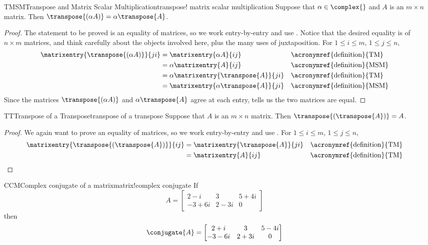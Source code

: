 %
\begin{theorem}{TMSM}{Transpose and Matrix Scalar Multiplication}{transpose! matrix scalar multiplication}
Suppose that $\alpha\in\complex{\null}$ and $A$ is an $m\times n$ matrix.  Then $\transpose{(\alpha A)}=\alpha\transpose{A}$.
%
\end{theorem}
%
\begin{proof}
The statement  to be proved is an equality of matrices, so we work entry-by-entry and use .  Notice that the desired equality is of $n\times m$ matrices, and think carefully about the objects involved here, plus the many uses of juxtaposition.  For $1\leq i\leq m$, $1\leq j\leq n$,
%
\begin{align*}
\matrixentry{\transpose{(\alpha A)}}{ji}&=
\matrixentry{\alpha A}{ij}&&\text{\acronymref{definition}{TM}}\\
&=\alpha\matrixentry{A}{ij}&&\text{\acronymref{definition}{MSM}}\\
&=\alpha\matrixentry{\transpose{A}}{ji}&&\text{\acronymref{definition}{TM}}\\
&=\matrixentry{\alpha\transpose{A}}{ji}&&\text{\acronymref{definition}{MSM}}
\end{align*}
%
Since the matrices $\transpose{(\alpha A)}$ and $\alpha\transpose{A}$ agree at each entry,  tells us the two matrices are equal.
%
\end{proof}
%
\begin{theorem}{TT}{Transpose of a Transpose}{transpose of a transpose}
Suppose that $A$ is an $m\times n$ matrix.  Then $\transpose{\left(\transpose{A}\right)}=A$.
%
\end{theorem}
%
\begin{proof}
We again want to prove an equality of matrices, so we work entry-by-entry and use .  For $1\leq i\leq m$, $1\leq j\leq n$,
%
\begin{align*}
%
\matrixentry{\transpose{\left(\transpose{A}\right)}}{ij}
&=\matrixentry{\transpose{A}}{ji}&&\text{\acronymref{definition}{TM}}\\
&=\matrixentry{A}{ij}&&\text{\acronymref{definition}{TM}}
%
\end{align*}
%
\end{proof}
%
%
\begin{example}{CCM}{Complex conjugate of a matrix}{matrix!complex conjugate}
If
%
\begin{equation*}
A=
\begin{bmatrix}
2-i & 3 & 5+4i\\
-3+6i & 2-3i & 0
\end{bmatrix}
\end{equation*}
%
then
%
\begin{equation*}
\conjugate{A}=
\begin{bmatrix}
2+i & 3 & 5-4i\\
-3-6i & 2+3i & 0
\end{bmatrix}
\end{equation*}
%
\end{example}
